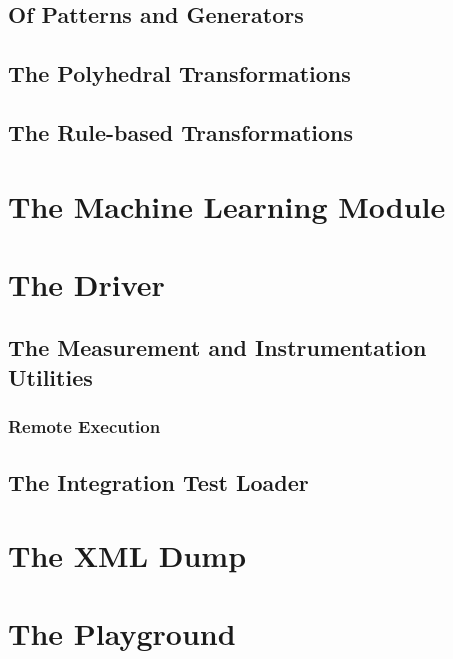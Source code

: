 \subsection{Of Patterns and Generators}
\subsection{The Polyhedral Transformations}
\subsection{The Rule-based Transformations}

\section{The Machine Learning Module}

\section{The Driver}
\subsection{The Measurement and Instrumentation Utilities}
\subsubsection{Remote Execution}
\subsection{The Integration Test Loader}

\section{The XML Dump}
\section{The Playground}
